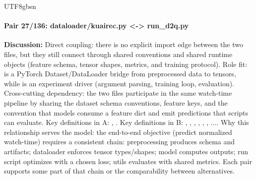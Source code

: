 \documentclass[11pt]{article}
\begin{document}
\begin{CJK*}{UTF8}{gbsn}
\paragraph{Pair 27/136: dataloader/kuairec.py <-> run\_d2q.py}
\textbf{Discussion:} Direct coupling: there is no explicit import edge between the two files, but they still connect through shared conventions and shared runtime objects (feature schema, tensor shapes, metrics, and training protocol). Role fit: \texttt{} is a PyTorch Dataset/DataLoader bridge from preprocessed data to tensors, while \texttt{} is an experiment driver (argument parsing, training loop, evaluation). Cross-cutting dependency: the two files participate in the same watch-time pipeline by sharing the dataset schema conventions, feature keys, and the convention that models consume a feature dict and emit predictions that scripts can evaluate. Key definitions in A: \texttt{}, \texttt{}. Key definitions in B: \texttt{}, \texttt{}, \texttt{}, \texttt{}, \texttt{}, \texttt{}, .... Why this relationship serves the model: the end-to-end objective (predict normalized watch-time) requires a consistent chain: preprocessing produces schema and artifacts; dataloader enforces tensor types/shapes; model computes outputs; run script optimizes with a chosen loss; utils evaluates with shared metrics. Each pair supports some part of that chain or the comparability between alternatives.


\end{CJK*}
\end{document}
